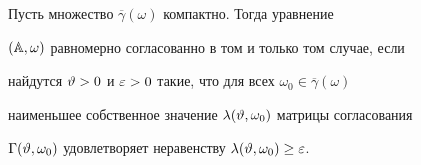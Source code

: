 \begin{thm}


\label{th4.2}


Пусть множество $\overline{\gamma}(\omega)$ компактно. Тогда уравнение


$(\Bbb A,\omega)$ равномерно согласованно в том и только том случае, если


найдутся $\vartheta>0$ и $\varepsilon>0$ такие, что для всех $\omega_0\in\overline\gamma(\omega)$


наименьшее собственное значение $\lambda(\vartheta,\omega_0)$ матрицы согласования


$\Gamma(\vartheta,\omega_0)$ удовлетворяет неравенству $\lambda(\vartheta,\omega_0)\ge\varepsilon$.


\end{thm}





